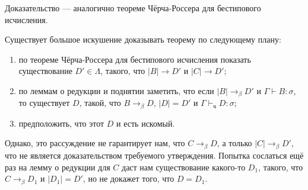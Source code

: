 \documentclass[10pt,a4paper,oneside]{article}
\begin{document}
\noindent Доказательство --- аналогично теореме Чёрча-Россера для бестипового исчисления.

Существует большое искушение доказывать теорему по следующему плану:
\begin{enumerate}
\item по теореме Чёрча-Россера для бестипового исчисления показать 
существование $D' \in \Lambda$, такого, что $|B| \rightarrow D'$ и $|C| \rightarrow D'$;
\item по леммам о редукции и поднятии заметить, что если $|B| \rightarrow_\beta D'$ и $\Gamma\vdash B:\sigma$, 
то существует $D$, такой, что $B \rightarrow_\beta D$, $|D| = D'$ и $\Gamma\vdash_\texttt{ч} D: \sigma$;
\item предположить, что этот $D$ и есть искомый.
\end{enumerate}

Однако, это рассуждение не гарантирует нам, что $C \rightarrow_\beta D$,
а только $|C| \rightarrow_\beta D'$, что не является доказательством требуемого утверждения.
Попытка сослаться ещё раз на лемму о редукции для $C$ даст нам существование какого-то $D_1$,
такого, что $C \rightarrow_\beta D_1$ и $|D_1|=D'$, но не докажет того, что $D = D_1$.
\end{document}
